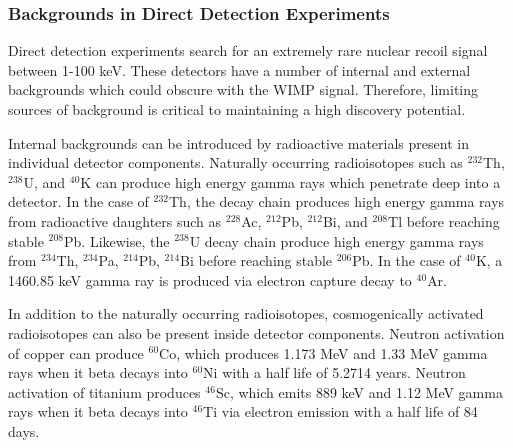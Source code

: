 \subsubsection{Backgrounds in Direct Detection Experiments} \label{Backgrounds}

Direct detection experiments search for an extremely rare nuclear recoil signal between 1-100 keV.  These detectors have a number of internal and external backgrounds which could obscure with the WIMP signal.  Therefore, limiting sources of background is critical to maintaining a high discovery potential.  

Internal backgrounds can be introduced by radioactive materials present in individual detector components.  Naturally occurring radioisotopes such as $^{232}$Th, $^{238}$U, and $^{40}$K can produce high energy gamma rays which penetrate deep into a detector.  In the case of $^{232}$Th, the decay chain produces high energy gamma rays from radioactive daughters such as $^{228}$Ac, $^{212}$Pb, $^{212}$Bi, and $^{208}$Tl before reaching stable $^{208}$Pb.  Likewise, the $^{238}$U decay chain produce high energy gamma rays from $^{234}$Th, $^{234}$Pa, $^{214}$Pb, $^{214}$Bi before reaching stable $^{206}$Pb.  In the case of $^{40}$K, a 1460.85 keV gamma ray is produced via electron capture decay to $^{40}$Ar.  

In addition to the naturally occurring radioisotopes, cosmogenically activated radioisotopes can also be present inside detector components.  Neutron activation of copper can produce $^{60}$Co, which produces 1.173 MeV and 1.33 MeV gamma rays when it beta decays into $^{60}$Ni with a half life of 5.2714 years.  Neutron activation of titanium produces $^{46}$Sc, which emits 889 keV and 1.12 MeV gamma rays when it beta decays into $^{46}$Ti via electron emission with a half life of 84 days. 


